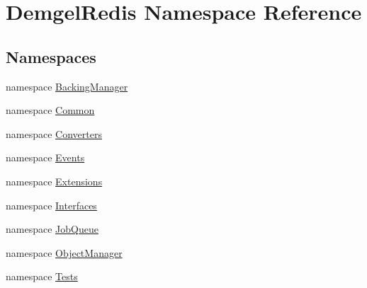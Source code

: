 \hypertarget{namespace_demgel_redis}{}\section{Demgel\+Redis Namespace Reference}
\label{namespace_demgel_redis}
\subsection*{Namespaces}
\begin{DoxyCompactItemize}
\item 
namespace \hyperlink{namespace_demgel_redis_1_1_backing_manager}{Backing\+Manager}
\item 
namespace \hyperlink{namespace_demgel_redis_1_1_common}{Common}
\item 
namespace \hyperlink{namespace_demgel_redis_1_1_converters}{Converters}
\item 
namespace \hyperlink{namespace_demgel_redis_1_1_events}{Events}
\item 
namespace \hyperlink{namespace_demgel_redis_1_1_extensions}{Extensions}
\item 
namespace \hyperlink{namespace_demgel_redis_1_1_interfaces}{Interfaces}
\item 
namespace \hyperlink{namespace_demgel_redis_1_1_job_queue}{Job\+Queue}
\item 
namespace \hyperlink{namespace_demgel_redis_1_1_object_manager}{Object\+Manager}
\item 
namespace \hyperlink{namespace_demgel_redis_1_1_tests}{Tests}
\end{DoxyCompactItemize}
